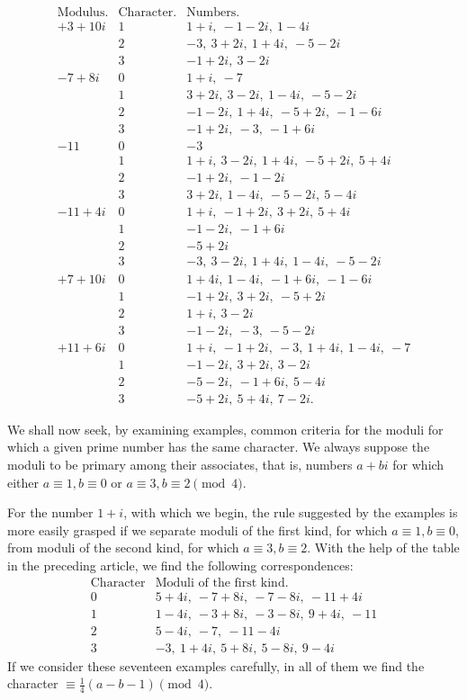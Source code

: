 %
\[
\begin{array}{r|c|l}
\text{Modulus.}&\text{Character.}&\text{Numbers.}\\\hline
+3+10i&1&1+i,\ -1-2i,\ 1-4i\\
&2&-3,\ 3+2i,\ 1+4i,\ -5-2i\\
&3&-1+2i,\ 3-2i\\
-7+8i&0&1+i,\ -7\\
&1&3+2i,\ 3-2i,\ 1-4i,\ -5-2i\\
&2&-1-2i,\ 1+4i,\ -5+2i,\ -1-6i\\
&3&-1+2i,\ -3,\ -1+6i\\
-11&0&-3\\
&1&1+i,\ 3-2i,\ 1+4i,\ -5+2i,\ 5+4i\\
&2&-1+2i,\ -1-2i\\
&3&3+2i,\ 1-4i,\ -5-2i,\ 5-4i\\
-11+4i&0&1+i,\ -1+2i,\ 3+2i,\ 5+4i\\
&1&-1-2i,\ -1+6i\\
&2&-5+2i\\
&3&-3,\ 3-2i,\ 1+4i,\ 1-4i,\ -5-2i\\
+7+10i&0&1+4i,\ 1-4i,\ -1+6i,\ -1-6i\\
&1&-1+2i,\ 3+2i,\ -5+2i\\
&2&1+i,\ 3-2i\\
&3&-1-2i,\ -3,\ -5-2i\\
+11+6i&0&1+i,\ -1+2i,\ -3,\ 1+4i,\ 1-4i,\ -7\\
&1&-1-2i,\ 3+2i,\ 3-2i\\
&2&-5-2i,\ -1+6i,\ 5-4i\\
&3&-5+2i,\ 5+4i,\ 7-2i.
\end{array}
\]

We shall now seek, by examining examples, common criteria for the moduli for which a given prime number has the same character. We always suppose the moduli to be primary among their associates, that is, numbers $a+bi$ for which either $a\equiv1,b\equiv0$ or $a\equiv3,b\equiv2\pmod4$.

For the number $1+i$, with which we begin, the rule suggested by the examples is more easily grasped if we separate moduli of the first kind, for which $a\equiv1,b\equiv0$, from moduli of the second kind, for which $a\equiv3,b\equiv2$. With the help of the table in the preceding article, we find the following correspondences:
%
\[
\begin{array}{c|l}
\text{Character}&\text{Moduli of the first kind.}\\\hline
0&5+4i,\ -7+8i,\ -7-8i,\ -11+4i\\
1&1-4i,\ -3+8i,\ -3-8i,\ 9+4i,\ -11\\
2&5-4i,\ -7,\ -11-4i\\
3&-3,\ 1+4i,\ 5+8i,\ 5-8i,\ 9-4i
\end{array}
\]
If we consider these seventeen examples carefully, in all of them we find the character $\equiv\frac14(a-b-1)\pmod4$.

